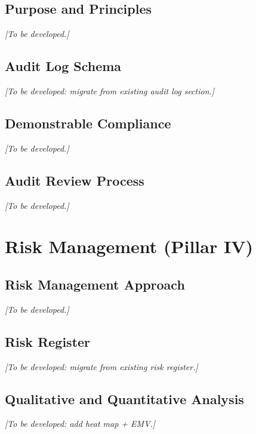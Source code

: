\documentclass[12pt,a4paper]{article}
\begin{document}
\subsection{Purpose and Principles}
\textit{[To be developed.]}

\subsection{Audit Log Schema}
\textit{[To be developed: migrate from existing audit log section.]}

\subsection{Demonstrable Compliance}
\textit{[To be developed.]}

\subsection{Audit Review Process}
\textit{[To be developed.]}

\section{Risk Management (Pillar IV)}

\subsection{Risk Management Approach}
\textit{[To be developed.]}

\subsection{Risk Register}
\textit{[To be developed: migrate from existing risk register.]}

\subsection{Qualitative and Quantitative Analysis}
\textit{[To be developed: add heat map + EMV.]}
\end{document}
